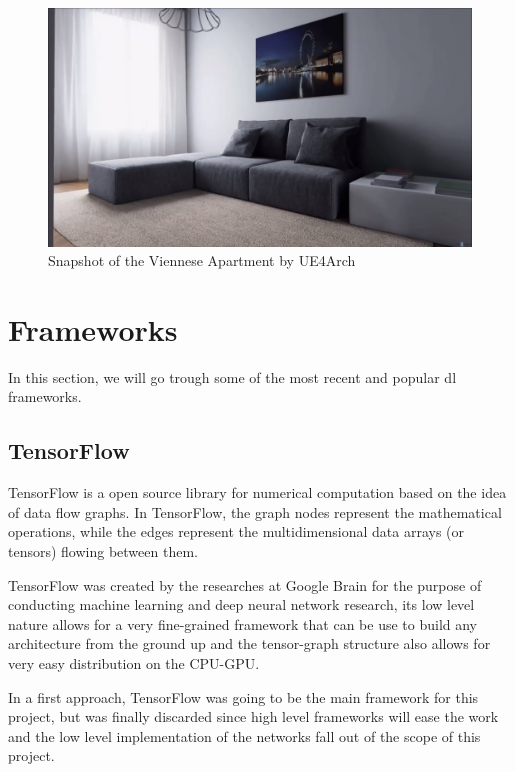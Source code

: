 \begin{figure}[h]
	\includegraphics[scale=0.2]{archivos/london_apartment.png}
	\centering
	\caption[Snapshot of the Viennese Apartbent by UE4Arch]{Snapshot of the Viennese Apartment by UE4Arch\footnotemark}
	\label{fig:london_apartment}
\end{figure}



\section{Frameworks}

In this section, we will go trough some of the most recent and popular \gls{dl} frameworks.

\subsection{TensorFlow}
TensorFlow is a open source library for numerical computation based on the idea of data flow graphs. In TensorFlow, the graph nodes represent the mathematical operations, while the edges represent the multidimensional data arrays (or tensors) flowing between them.

TensorFlow was created by the researches at Google Brain for the purpose of conducting machine learning and deep neural network research, its low level nature allows for a very fine-grained framework that can be use to build any architecture from the ground up and the tensor-graph structure also allows for very easy distribution on the CPU-GPU.


In a first approach, TensorFlow was going to be the main framework for this project, but was finally discarded since high level frameworks will ease the work and the low level implementation of the networks fall out of the scope of this project.

